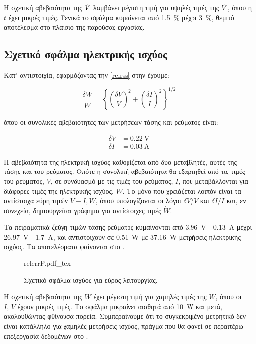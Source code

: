 Η σχετική αβεβαιότητα της $\dot{\volume}$ λαμβάνει μέγιστη τιμή για υψηλές τιμές της $\dot{\volume}$, όπου η $t$ έχει μικρές τιμές. Γενικά το σφάλμα κυμαίνεται από \qty{1.5}{\percent} μέχρι \qty{3}{\percent}, θεμιτό αποτέλεσμα στο πλαίσιο της παρούσας εργασίας.

\subsection{Σχετικό σφάλμα ηλεκτρικής ισχύος}\label{powerunc}

\noindent Κατ' αντιστοιχία, εφαρμόζοντας την \ref{relrss} στην  έχουμε:

\begin{equation*}
\frac{\delta \dot{W}}{\dot{W}} = \left\{\left(\frac{\delta V}{V} \right) ^ 2 + \left(\frac{\delta I}{I} \right) ^ 2 \right\} ^ {1/2} 
\end{equation*}

\noindent όπου οι συνολικές αβεβαιότητες των μετρήσεων τάσης και ρεύματος είναι:

\begin{align*}
\delta V &= \qty{0.22}{\volt}\\
\delta I &= \qty{0.03}{\ampere}
\end{align*}

\noindent Η αβεβαιότητα της ηλεκτρική ισχύος καθορίζεται από δύο μεταβλητές, αυτές της τάσης και του ρεύματος. Οπότε η συνολική αβεβαιότητα θα εξαρτηθεί από τις τιμές του ρεύματος, $V$, σε συνδυασμό με τις τιμές του ρεύματος, $I$, που μεταβάλλονται για διάφορες τιμές της ηλεκτρικής ισχύος, $\dot{W}$. Το μόνο που χρειάζεται λοιπόν είναι τα αντίστοιχα εύρη τιμών $V-I, \dot{W}$, όπου υπολογίζονται οι λόγοι $\delta V / V$ και $\delta I / I$ και, εν συνεχεία, δημιουργείται γράφημα για αντίστοιχες τιμές $\dot{W}$.

Τα πειραματικά ζεύγη τιμών τάσης-ρεύματος κυμαίνονται από \qty{3.96}{\volt} - \qty{0.13}{\ampere} μέχρι \qty{26.97}{\volt} - \qty{1.7}{\ampere}, και αντιστοιχούν σε \qty{0.51}{\watt} με \qty{37.16}{\watt} μετρήσεις ηλεκτρικής ισχύος. Τα αποτελέσματα φαίνονται στο .

\begin{figure}[!htbp]
\centering
{relerrP.pdf_tex}
\caption{Σχετικό σφάλμα ισχύος για εύρος λειτουργίας.}\label{plt:relpowerE}
\end{figure}

Η σχετική αβεβαιότητα της $\dot{W}$ έχει μέγιστη τιμή για χαμηλές τιμές της $\dot{W}$, όπου οι $I, \, V$ έχουν μικρές τιμές. Το σφάλμα μικραίνει αισθητά από \qty{10}{\watt} και μετά, ακολουθώντας φθίνουσα πορεία. Συμπεραίνουμε ότι το συγκεκριμένο μετρητικό δεν είναι κατάλληλο για χαμηλές μετρήσεις ισχύος, πράγμα που θα φανεί σε περαιτέρω επεξεργασία δεδομένων στο .

